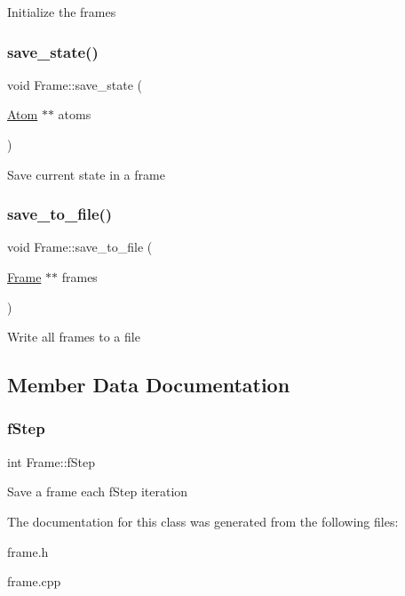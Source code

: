 Initialize the frames \mbox{\label{class_frame_a03b0febb7a423f343a97f5b937ca74bb}} 
\subsubsection{\texorpdfstring{save\+\_\+state()}{save\_state()}}
{\footnotesize\ttfamily void Frame\+::save\+\_\+state (\begin{DoxyParamCaption}\item[{\mbox{\hyperlink{class_atom}{Atom}} $\ast$$\ast$}]{atoms }\end{DoxyParamCaption})}

Save current state in a frame \mbox{\label{class_frame_aa3523e2ec8247c6c5f2bb102d5016971}} 
\subsubsection{\texorpdfstring{save\+\_\+to\+\_\+file()}{save\_to\_file()}}
{\footnotesize\ttfamily void Frame\+::save\+\_\+to\+\_\+file (\begin{DoxyParamCaption}\item[{\mbox{\hyperlink{class_frame}{Frame}} $\ast$$\ast$}]{frames }\end{DoxyParamCaption})\hspace{0.3cm}{\ttfamily [static]}}

Write all frames to a file 

\subsection{Member Data Documentation}
\mbox{\label{class_frame_ae7615c7221ced614d59ce461deed3a5f}} 
\subsubsection{\texorpdfstring{f\+Step}{fStep}}
{\footnotesize\ttfamily int Frame\+::f\+Step\hspace{0.3cm}{\ttfamily [static]}}

Save a frame each f\+Step iteration 

The documentation for this class was generated from the following files\+:\begin{DoxyCompactItemize}
\item 
frame.\+h\item 
frame.\+cpp\end{DoxyCompactItemize}
